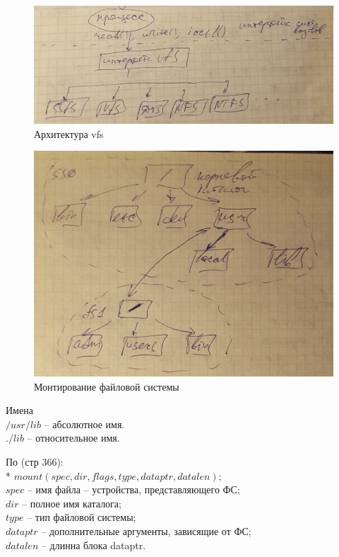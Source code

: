 \begin{figure}[H]
  \centering
  \includegraphics[width=\textwidth]{pic/1.png}
  \caption{Архитектура vfs}
\end{figure}

\begin{figure}[h!]
  \centering
  \includegraphics[width=\textwidth]{pic/2.png}
  \caption{Монтирование файловой системы}
\end{figure}

Имена\\
$/usr/lib$ – абсолютное имя.\\
$./lib$ – относительное имя.

По \cite{UNIX_Internals} (стр 366):\\*
$mount (spec, dir, flags, type, dataptr, datalen);$\\
$spec$ – имя файла – устройства, представляющего ФС;\\
$dir$ – полное имя каталога;\\
$type$ – тип файловой системы;\\
$dataptr$ – дополнительные аргументы, зависящие от ФС;\\
$datalen$ – длинна блока dataptr.

